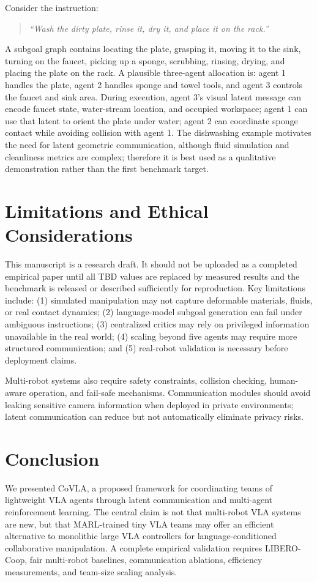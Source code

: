 \documentclass[11pt]{article}
\newcommand{\method}{CoVLA}
\newcommand{\liberocoop}{LIBERO-Coop}
\begin{document}
Consider the instruction:
\begin{quote}
\emph{``Wash the dirty plate, rinse it, dry it, and place it on the rack.''}
\end{quote}
A subgoal graph contains locating the plate, grasping it, moving it to the sink, turning on the faucet, picking up a sponge, scrubbing, rinsing, drying, and placing the plate on the rack. A plausible three-agent allocation is: agent 1 handles the plate, agent 2 handles sponge and towel tools, and agent 3 controls the faucet and sink area. During execution, agent 3's visual latent message can encode faucet state, water-stream location, and occupied workspace; agent 1 can use that latent to orient the plate under water; agent 2 can coordinate sponge contact while avoiding collision with agent 1. The dishwashing example motivates the need for latent geometric communication, although fluid simulation and cleanliness metrics are complex; therefore it is best used as a qualitative demonstration rather than the first benchmark target.

\section{Limitations and Ethical Considerations}

This manuscript is a research draft. It should not be uploaded as a completed empirical paper until all TBD values are replaced by measured results and the benchmark is released or described sufficiently for reproduction. Key limitations include: (1) simulated manipulation may not capture deformable materials, fluids, or real contact dynamics; (2) language-model subgoal generation can fail under ambiguous instructions; (3) centralized critics may rely on privileged information unavailable in the real world; (4) scaling beyond five agents may require more structured communication; and (5) real-robot validation is necessary before deployment claims.

Multi-robot systems also require safety constraints, collision checking, human-aware operation, and fail-safe mechanisms. Communication modules should avoid leaking sensitive camera information when deployed in private environments; latent communication can reduce but not automatically eliminate privacy risks.

\section{Conclusion}

We presented \method{}, a proposed framework for coordinating teams of lightweight VLA agents through latent communication and multi-agent reinforcement learning. The central claim is not that multi-robot VLA systems are new, but that MARL-trained tiny VLA teams may offer an efficient alternative to monolithic large VLA controllers for language-conditioned collaborative manipulation. A complete empirical validation requires \liberocoop{}, fair multi-robot baselines, communication ablations, efficiency measurements, and team-size scaling analysis.



\end{document}
